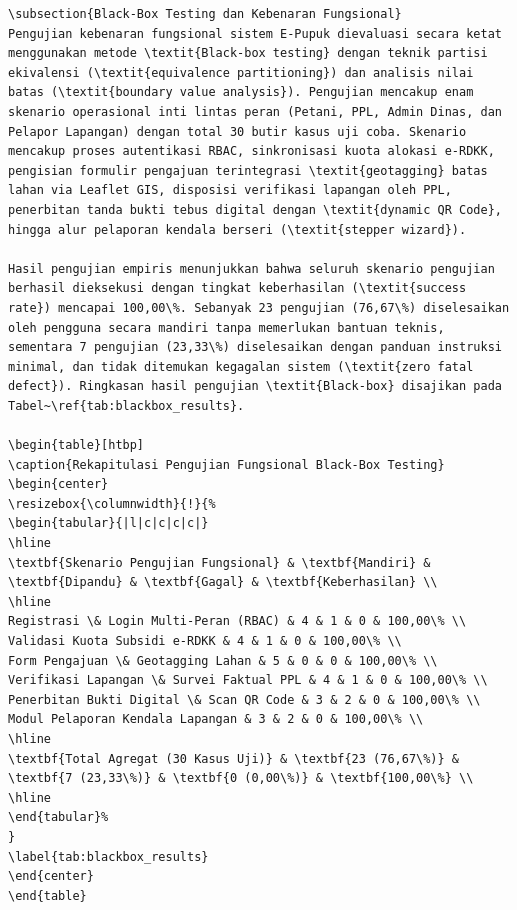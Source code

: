 \documentclass[conference]{IEEEtran}
\begin{document}
\begin{lstlisting}
\subsection{Black-Box Testing dan Kebenaran Fungsional}
Pengujian kebenaran fungsional sistem E-Pupuk dievaluasi secara ketat menggunakan metode \textit{Black-box testing} dengan teknik partisi ekivalensi (\textit{equivalence partitioning}) dan analisis nilai batas (\textit{boundary value analysis}). Pengujian mencakup enam skenario operasional inti lintas peran (Petani, PPL, Admin Dinas, dan Pelapor Lapangan) dengan total 30 butir kasus uji coba. Skenario mencakup proses autentikasi RBAC, sinkronisasi kuota alokasi e-RDKK, pengisian formulir pengajuan terintegrasi \textit{geotagging} batas lahan via Leaflet GIS, disposisi verifikasi lapangan oleh PPL, penerbitan tanda bukti tebus digital dengan \textit{dynamic QR Code}, hingga alur pelaporan kendala berseri (\textit{stepper wizard}).

Hasil pengujian empiris menunjukkan bahwa seluruh skenario pengujian berhasil dieksekusi dengan tingkat keberhasilan (\textit{success rate}) mencapai 100,00\%. Sebanyak 23 pengujian (76,67\%) diselesaikan oleh pengguna secara mandiri tanpa memerlukan bantuan teknis, sementara 7 pengujian (23,33\%) diselesaikan dengan panduan instruksi minimal, dan tidak ditemukan kegagalan sistem (\textit{zero fatal defect}). Ringkasan hasil pengujian \textit{Black-box} disajikan pada Tabel~\ref{tab:blackbox_results}.

\begin{table}[htbp]
\caption{Rekapitulasi Pengujian Fungsional Black-Box Testing}
\begin{center}
\resizebox{\columnwidth}{!}{%
\begin{tabular}{|l|c|c|c|c|}
\hline
\textbf{Skenario Pengujian Fungsional} & \textbf{Mandiri} & \textbf{Dipandu} & \textbf{Gagal} & \textbf{Keberhasilan} \\
\hline
Registrasi \& Login Multi-Peran (RBAC) & 4 & 1 & 0 & 100,00\% \\
Validasi Kuota Subsidi e-RDKK & 4 & 1 & 0 & 100,00\% \\
Form Pengajuan \& Geotagging Lahan & 5 & 0 & 0 & 100,00\% \\
Verifikasi Lapangan \& Survei Faktual PPL & 4 & 1 & 0 & 100,00\% \\
Penerbitan Bukti Digital \& Scan QR Code & 3 & 2 & 0 & 100,00\% \\
Modul Pelaporan Kendala Lapangan & 3 & 2 & 0 & 100,00\% \\
\hline
\textbf{Total Agregat (30 Kasus Uji)} & \textbf{23 (76,67\%)} & \textbf{7 (23,33\%)} & \textbf{0 (0,00\%)} & \textbf{100,00\%} \\
\hline
\end{tabular}%
}
\label{tab:blackbox_results}
\end{center}
\end{table}


\end{lstlisting}
\end{document}
